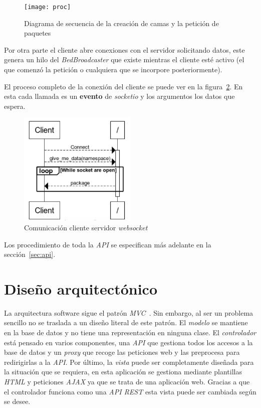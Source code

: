 \begin{figure}
	\centering
	\texttt{[image: proc]}
	\caption{Diagrama de secuencia de la creación de camas y la petición de paquetes}
	\label{fig:proc_sec}
\end{figure}

Por otra parte el cliente abre conexiones con el servidor solicitando datos, este genera un hilo del \textit{BedBroadcaster} que existe mientras el cliente esté activo (el que comenzó la petición o cualquiera que se incorpore posteriormente). 

El proceso completo de la conexión del cliente se puede ver en la figura~\ref{fig:ws-secuence}. En esta cada llamada es un \textbf{evento} de \textit{socketio} y los argumentos los datos que espera. 

\begin{figure}
	\centering
	\includegraphics[width=0.5\textwidth]{img/ws-secuence.png}
	\caption{Comunicación cliente servidor \textit{websocket}}
	\label{fig:ws-secuence}
\end{figure}

Los procedimiento de toda la \textit{API} se especifican más adelante en la sección~\ref{sec:api}.

\section{Diseño arquitectónico}

La arquitectura software sigue el patrón \textit{MVC}~\cite{wiki:mvc}. Sin embargo, al ser un problema sencillo no se traslada a un diseño literal de este patrón. El \textit{modelo} se mantiene en la base de datos y no tiene una representación en ninguna clase. El \textit{controlador} está pensado en varios componentes, una \textit{API} que gestiona todos los accesos a la base de datos y un \textit{proxy} que recoge las peticiones web y las preprocesa para redirigirlas a la \textit{API}. Por último, la \textit{vista} puede ser completamente diseñada para la situación que se requiera, en esta aplicación se gestiona mediante plantillas \textit{HTML} y peticiones \textit{AJAX} ya que se trata de una aplicación web. Gracias a que el controlador funciona como una \textit{API REST} esta vista puede ser cambiada según se desee.

